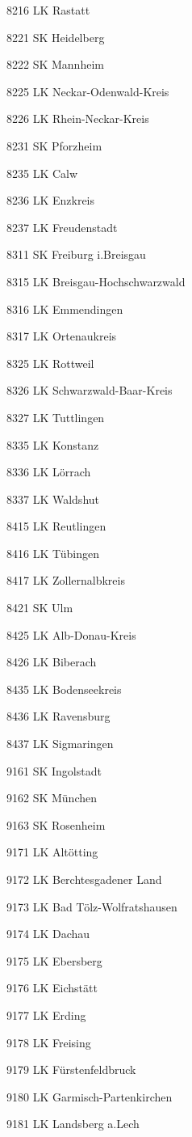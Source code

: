 8216  LK Rastatt

8221  SK Heidelberg

8222  SK Mannheim

8225  LK Neckar-Odenwald-Kreis

8226  LK Rhein-Neckar-Kreis

8231  SK Pforzheim

8235  LK Calw

8236  LK Enzkreis

8237  LK Freudenstadt

8311  SK Freiburg i.Breisgau

8315  LK Breisgau-Hochschwarzwald

8316  LK Emmendingen

8317  LK Ortenaukreis

8325  LK Rottweil

8326  LK Schwarzwald-Baar-Kreis

8327  LK Tuttlingen

8335  LK Konstanz

8336  LK Lörrach

8337  LK Waldshut

8415  LK Reutlingen

8416  LK Tübingen

8417  LK Zollernalbkreis

8421  SK Ulm

8425  LK Alb-Donau-Kreis

8426  LK Biberach

8435  LK Bodenseekreis

8436  LK Ravensburg

8437  LK Sigmaringen

9161  SK Ingolstadt

9162  SK München

9163  SK Rosenheim

9171  LK Altötting

9172  LK Berchtesgadener Land

9173  LK Bad Tölz-Wolfratshausen

9174  LK Dachau

9175  LK Ebersberg

9176  LK Eichstätt

9177  LK Erding

9178  LK Freising

9179  LK Fürstenfeldbruck

9180  LK Garmisch-Partenkirchen

9181  LK Landsberg a.Lech

